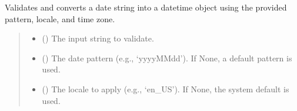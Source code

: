 \documentclass[letterpaper,10pt,english]{sphinxmanual}
\begin{document}
\begin{fulllineitems}

\begin{fulllineitems}
\label{\detokenize{apache_commons_validator_python.routines:apache_commons_validator_python.routines.date_validator.DateValidator.validate}}
\pysigstartsignatures
{}
\pysigstopsignatures
\sphinxAtStartPar
Validates and converts a date string into a datetime object using the
provided pattern, locale, and time zone.
\begin{quote}\begin{description}
\begin{itemize}
\item {} 
\sphinxAtStartPar
{} () \textendash{} The input string to validate.

\item {} 
\sphinxAtStartPar
{} (\sphinxstyleliteralemphasis{\sphinxupquote{{[}}}\sphinxstyleliteralemphasis{\sphinxupquote{{]}}}) \textendash{} The date pattern (e.g., ‘yyyy\sphinxhyphen{}MM\sphinxhyphen{}dd’). If None, a default pattern is used.

\item {} 
\sphinxAtStartPar
{} (\sphinxstyleliteralemphasis{\sphinxupquote{{[}}}\sphinxstyleliteralemphasis{\sphinxupquote{{]}}}) \textendash{} The locale to apply (e.g., ‘en\_US’). If None, the system default is used.


\end{itemize}
\end{description}
\end{quote}
\end{fulllineitems}
\end{fulllineitems}
\end{document}
